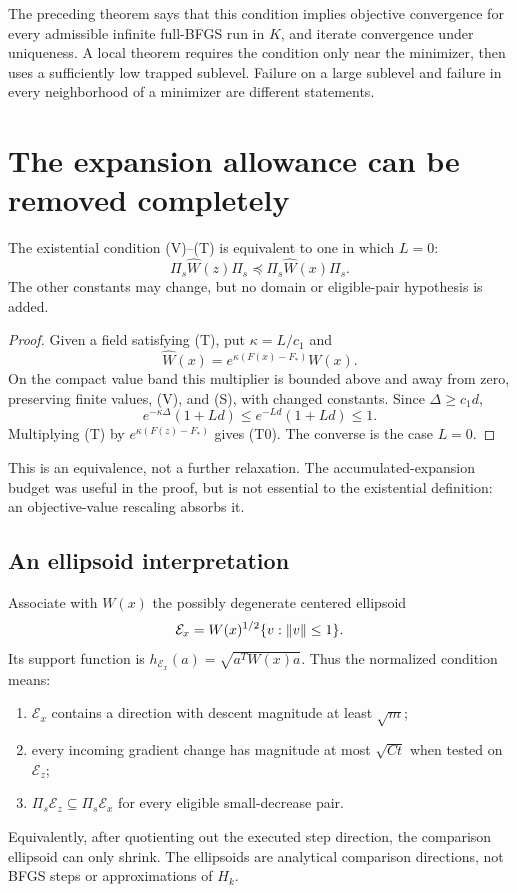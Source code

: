 The preceding theorem says that this condition implies objective convergence for every admissible infinite full-BFGS run in $K$, and iterate convergence under uniqueness. A local theorem requires the condition only near the minimizer, then uses a sufficiently low trapped sublevel. Failure on a large sublevel and failure in every neighborhood of a minimizer are different statements.


\setcounter{section}{1}
\setcounter{theorem}{0}
\setcounter{equation}{1}


\section{The expansion allowance can be removed completely}

\begin{proposition}
The existential condition (V)--(T) is equivalent to one in which $L=0$:
\begin{equation}
 \Pi_s\widehat W(z)\Pi_s\preceq\Pi_s\widehat W(x)\Pi_s. \tag{5.T0}
\end{equation}
The other constants may change, but no domain or eligible-pair hypothesis is added.
\end{proposition}
\begin{proof}
Given a field satisfying (T), put $\kappa=L/c_1$ and
\[
 \widehat W(x)=e^{\kappa(F(x)-F_*)}W(x).
\]
On the compact value band this multiplier is bounded above and away from zero, preserving finite values, (V), and (S), with changed constants. Since $\Delta\ge c_1d$,
\[
 e^{-\kappa\Delta}(1+Ld)\le e^{-Ld}(1+Ld)\le1.
\]
Multiplying (T) by $e^{\kappa(F(z)-F_*)}$ gives (T0). The converse is the case $L=0$.
\end{proof}
This is an equivalence, not a further relaxation. The accumulated-expansion budget was useful in the proof, but is not essential to the existential definition: an objective-value rescaling absorbs it.



\subsection{An ellipsoid interpretation}
Associate with $W(x)$ the possibly degenerate centered ellipsoid
\[
 \mathcal E_x=W(x)^{1/2}\{v:\left\|v\right\|\le1\}.
\]
Its support function is $h_{\mathcal E_x}(a)=\sqrt{a^TW(x)a}$. Thus the normalized condition means:
\begin{enumerate}[label=(\roman*),itemsep=3pt]
\item $\mathcal E_x$ contains a direction with descent magnitude at least $\sqrt m$;
\item every incoming gradient change has magnitude at most $\sqrt{Ct}$ when tested on $\mathcal E_z$;
\item $\Pi_s\mathcal E_z\subseteq\Pi_s\mathcal E_x$ for every eligible small-decrease pair.
\end{enumerate}
Equivalently, after quotienting out the executed step direction, the comparison ellipsoid can only shrink. The ellipsoids are analytical comparison directions, not BFGS steps or approximations of $H_k$.

